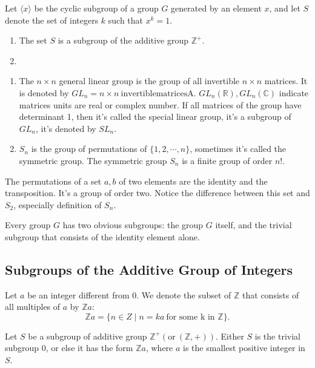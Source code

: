 \documentclass{tufte-handout}
\newcommand{\Z}{\mathbb{Z}}
\begin{document}
\begin{proposition}
	Let $\langle x\rangle$ be the cyclic subgroup of a group $G$ generated by an element $x$, and let $S$ denote the set of integers $k$ such that $x^k=1$.
	\begin{enumerate}
		\item The set $S$ is a subgroup of the additive group $\Z^{+}$.
		\item  
	\end{enumerate}
\end{proposition}


\begin{enumerate}
	\item The $n\times n$ general linear group is the group of all invertible $n\times n$ matrices. It is denoted by $GL_n = {n\times n~\mathrm{invertible matrices A}}$. $GL_n(\mathbb{R}), GL_n(\mathbb{C})$ indicate matrices units are real or complex number. If all matrices of the group have determinant 1, then it's called the special linear group, it's a subgroup of $GL_n$, it's denoted by $SL_n$.
	\item $S_n$ is the group of permutations of $\{1, 2,\cdots,n\}$, sometimes it's called the symmetric group. The symmetric group $S_n$ is a finite group of order $n!$.
\end{enumerate}

The permutations of a set ${a, b}$ of two elements are the identity and the transposition. It's a group of order two. Notice the difference between this set and $S_2$, especially definition of $S_n$.

Every group $G$ has two obvious subgroups: the group $G$ itself, and the trivial subgroup that consists of the identity element alone.

\subsection{Subgroups of the Additive Group of Integers}

Let $a$ be an integer different from 0. We denote the subset of $\mathbb{Z}$ that consists of all multiples of $a$ by $\mathbb{Z}a$: 
\begin{equation}
	\Z a =\{n\in Z\mid n=ka~\text{for some k in } \Z\}.
\end{equation}

\begin{theorem}
	Let $S$ be a subgroup of additive group $\Z^{+} (\mathrm{or}~(\Z, +))$. Either $S$ is the trivial subgroup ${0}$, or else it has the form $\Z a$, where $a$ is the smallest positive integer in $S$.
\end{theorem}
\end{document}

